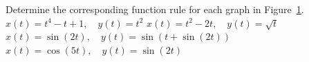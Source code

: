 \begin{Exercise} %
Determine the corresponding function rule for each graph in Figure~\ref{grafs_par_eq}.
\Question $x(t)=t^4-t+1, \quad y(t)=t^2$
\Question $x(t)=t^2-2t,  \quad y(t)=\sqrt{t}$
\Question $x(t)=\sin(2t),  \quad y(t)=\sin(t+\sin(2t))$
\Question $x(t)=\cos(5t),  \quad y(t)=\sin(2t)$
\EndCurrentQuestion
\begin{figure}[H]
\centering
\centerline{
\hspace*{0.5cm}
}
\centerline{
\hspace*{0.5cm}
}
\caption{\label{grafs_par_eq}}
\end{figure}
\end{Exercise}

